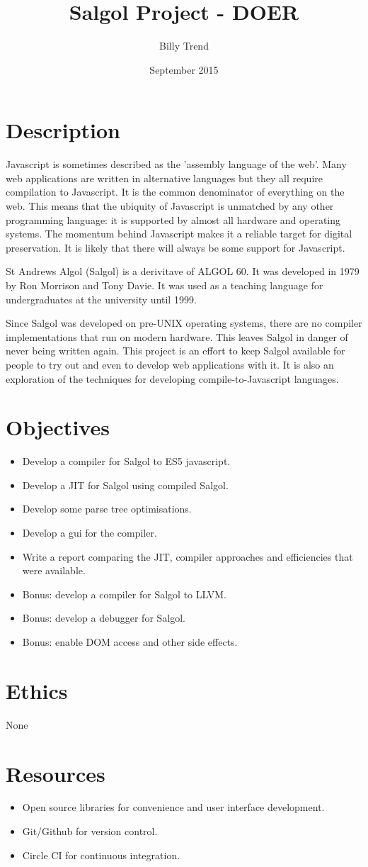 \documentclass{article}
\title{Salgol Project - DOER}
\author{Billy Trend}
\date{September 2015}
\begin{document}
\maketitle

\section{Description}

Javascript is sometimes described as the 'assembly language of the web'. Many web applications are written in alternative languages but they all require compilation to Javascript. It is the common denominator of everything on the web. This means that the ubiquity of Javascript is unmatched by any other programming language: it is supported by almost all hardware and operating systems. The momentum behind Javascript makes it a reliable target for digital preservation. It is likely that there will always be some support for Javascript.

St Andrews Algol (Salgol) is a derivitave of ALGOL 60. It was developed in 1979 by Ron Morrison and Tony Davie. It was used as a teaching language for undergraduates at the university until 1999.

Since Salgol was developed on pre-UNIX operating systems, there are no compiler implementations that run on modern hardware. This leaves Salgol in danger of never being written again. This project is an effort to keep Salgol available for people to try out and even to develop web applications with it. It is also an exploration of the techniques for developing compile-to-Javascript languages.

\section{Objectives}

\begin{itemize}
\item Develop a compiler for Salgol to ES5 javascript.
\item Develop a JIT for Salgol using compiled Salgol.
\item Develop some parse tree optimisations.
\item Develop a gui for the compiler.
\item Write a report comparing the JIT, compiler approaches and efficiencies that were available.
\item Bonus: develop a compiler for Salgol to LLVM.
\item Bonus: develop a debugger for Salgol.
\item Bonus: enable DOM access and other side effects.
\end{itemize}

\section{Ethics}
None
\section{Resources}
\begin{itemize}
\item Open source libraries for convenience and user interface development.
\item Git/Github for version control.
\item Circle CI for continuous integration.

\end{itemize}
\end{document}

